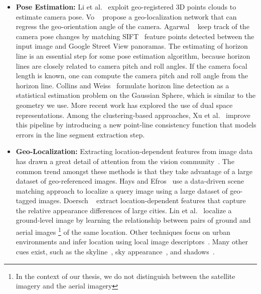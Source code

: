 \begin{itemize}[noitemsep]

\item \textbf{Pose Estimation:}
Li et al.~\cite{li2012worldwide} exploit geo-registered 3D points
clouds to estimate camera pose.
Vo \etal~\cite{vo2016localizing} propose a geo-localization network
that can regress the geo-orientation angle of the camera.
Agarwal \etal~\cite{agarwal2015metric} keep track of the camera pose
changes by matching SIFT~\cite{lowe1999object} feature points detected
between the input image and Google Street View panoramas.
%
The estimating of horizon line is an essential step for some pose
estimation algorithm, because horizon lines are closely related to
camera pitch and roll angles. If the camera focal length is known, one
can compute the camera pitch and roll angle from the horizon line.
Collins and Weiss~\cite{unitsphere1990} formulate horizon line
detection as a statistical estimation problem on the Gaussian Sphere,
which is similar to the geometry we use.  More recent work has
explored the use of dual space~\cite{alignment2014,dualspace2013}
representations. Among the clustering-based approaches, Xu et
al.~\cite{kitware2013} improve this pipeline by introducing a new
point-line consistency function that models errors in the line segment
extraction step.
\newline

\item \textbf{Geo-Localization:}
Extracting location-dependent features from
image data has drawn a great detail of attention from the vision
community~\cite{jacobs07geolocate, jacobs11geolocate,
jacobs08geoorient}. The common trend amongst these methods is that
they take advantage of a large dataset of geo-referenced images. Hays
and Efros~\cite{hays2008im2gps} use a data-driven scene matching
approach to localize a query image using a large dataset of geo-tagged
images.  Doersch \etal~\cite{doersch2012what} extract
location-dependent features that capture the relative appearance
differences of large cities.  Lin et al.~\cite{lin2013cross} localize
a ground-level image by learning the relationship between pairs of
ground and aerial images \footnote{In the context of our thesis, we
do not distinguish between the satellite imagery and the aerial
imagery} of the same location. Other techniques focus
on urban environments and infer location using local image
descriptors~\cite{schindler2008detecting,snavely2006photo}.
Many other cues exist, such as the
skyline~\cite{baatz2012large,ramalingam2009geolocalization}, sky
appearance~\cite{lalonde2010sun,workman2014rainbow}, and
shadows~\cite{junejo2008estimating,wu2010geo}.
\newline


\end{itemize}
